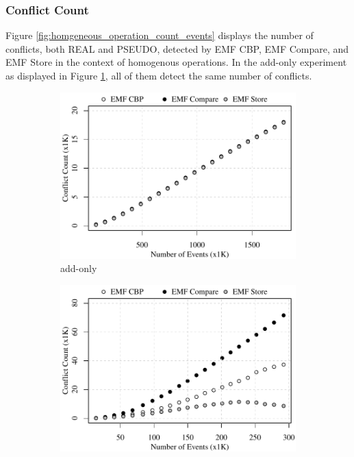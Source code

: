 \subsubsection{Conflict Count}
\label{sec:conflict_count}
Figure \ref{fig:homgeneous_operation_count_events} displays the number of conflicts, both \textsf{REAL} and \textsf{PSEUDO}, detected by EMF CBP, EMF Compare, and EMF Store in the context of homogenous operations. In the add-only experiment as displayed in Figure \ref{fig:add-conflict-count-events}, all of them detect the same number of conflicts.

\begin{figure}[ht]
  \centering
  \begin{subfigure}[t]{0.490\linewidth}
    \includegraphics[width=\linewidth]{add-conflict-count-events}
    \caption{add-only}
    \label{fig:add-conflict-count-events}
  \end{subfigure}
  \hfill
  \begin{subfigure}[t]{0.490\linewidth}
    \includegraphics[width=\linewidth]{delete-conflict-count-events}

\end{subfigure}
\end{figure}
